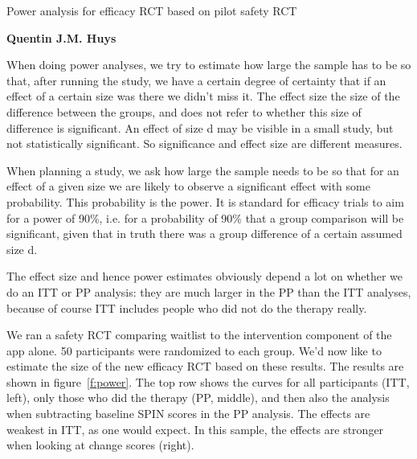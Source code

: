 
\graphicspath{ {./figs/} }


\pagestyle{fancy}
\renewcommand{\sectionmark}[1]{\markboth{#1}{ }}
\rhead{\sc{\leftmark}}
\lfoot{\sc{}}

\newcommand{\ts}[1]{\textsuperscript{#1}}



\newcommand{\shorttitle}{Power analysis}
\renewcommand{\title}{Power analysis for efficacy RCT based on pilot safety RCT\par}
\thispagestyle{empty}

{\huge \title }

{\bf Quentin J.M. Huys
}

When doing power analyses, we try to estimate how large the sample has to be so
that, after running the study, we have a certain degree of certainty that if an
effect of a certain size was there we didn't miss it. The effect size the size
of the difference between the groups, and does not refer to whether this size of
difference is significant. An effect of size d may be visible in a small study,
but not statistically significant. So significance and effect size are different
measures. 

When planning a study, we ask how large the sample needs to be so that for an
effect of a given size we are likely to observe a significant effect with some
probability. This probability is the power. It is standard for efficacy trials
to aim for a power of 90\%, i.e. for a probability of 90\% that a group
comparison will be significant, given that in truth there was a group difference
of a certain assumed size d. 

The effect size and hence power estimates obviously depend a lot on whether we
do an ITT or PP analysis: they are much larger in the PP than the ITT analyses,
because of course ITT includes people who did not do the therapy really. 

We ran a safety RCT comparing waitlist to the intervention component of the app
alone. 50 participants were randomized to each group. We'd now like to estimate
the size of the new efficacy RCT based on these results. The results are shown
in figure~\ref{f:power}. The top row shows the curves for all participants (ITT,
left), only those who did the therapy (PP, middle), and then also the analysis
when subtracting baseline SPIN scores in the PP analysis. The effects are
weakest in ITT, as one would expect. In this sample, the effects are stronger
when looking at change scores (right). 

